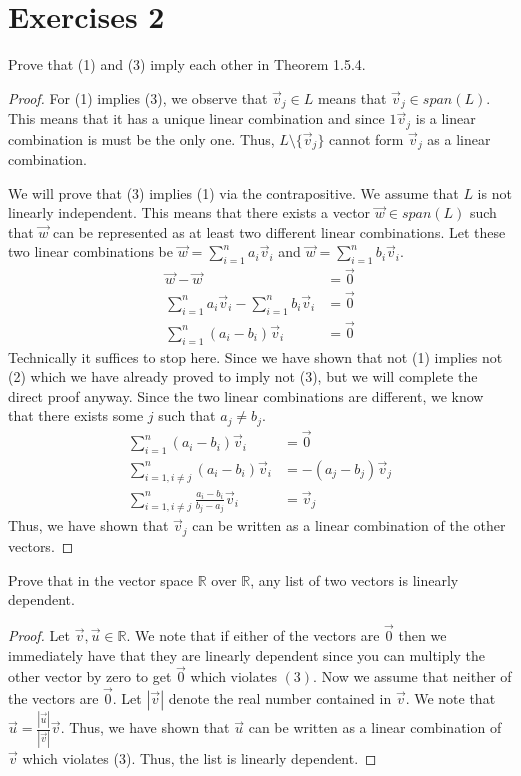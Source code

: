 \section{Exercises 2}
\begin{exercise}
    Prove that (1) and (3) imply each other in Theorem 1.5.4.
\end{exercise}
\begin{proof}
    For (1) implies (3), we observe that $\vec{v}_j\in L$ means that $\vec{v}_j\in span(L)$. This means that it has a unique linear combination and since $1\vec{v}_j$ is a linear combination is must be the only one. Thus, $L\setminus\{\vec{v}_j\}$ cannot form $\vec{v}_j$ as a linear combination.

    We will prove that (3) implies (1) via the contrapositive. We assume that $L$ is not linearly independent. This means that there exists a vector $\vec{w}\in span(L)$ such that $\vec{w}$ can be represented as at least two different linear combinations. Let these two linear combinations be $\vec{w}=\sum_{i=1}^n a_i\vec{v}_i$ and $\vec{w}=\sum_{i=1}^n b_i\vec{v}_i$.
    \begin{align*}
        \vec{w}-\vec{w}&=\vec{0}\\
        \sum_{i=1}^n a_i\vec{v}_i-\sum_{i=1}^n b_i\vec{v}_i&=\vec{0}\\
        \sum_{i=1}^n (a_i-b_i)\vec{v}_i&=\vec{0}
    \end{align*}
    Technically it suffices to stop here. Since we have shown that not (1) implies not (2) which we have already proved to imply not (3), but we will complete the direct proof anyway. Since the two linear combinations are different, we know that there exists some $j$ such that $a_j\neq b_j$.
    \begin{align*}
        \sum_{i=1}^n (a_i-b_i)\vec{v}_i&=\vec{0}\\
        \sum_{i=1, i\neq j}^n (a_i-b_i)\vec{v}_i&=-(a_j-b_j)\vec{v}_j\\
        \sum_{i=1, i\neq j}^n \frac{a_i-b_i}{b_j-a_j}\vec{v}_i&=\vec{v}_j
    \end{align*}
    Thus, we have shown that $\vec{v}_j$ can be written as a linear combination of the other vectors.
\end{proof}
\begin{exercise}
    Prove that in the vector space $\mathbb{R}$ over $\mathbb{R}$, any list of two vectors is linearly dependent.
\end{exercise}
\begin{proof}
    Let $\vec{v},\vec{u}\in\mathbb{R}$. We note that if either of the vectors are $\vec{0}$ then we immediately have that they are linearly dependent since you can multiply the other vector by zero to get $\vec{0}$ which violates $(3)$. Now we assume that neither of the vectors are $\vec{0}$. Let $|\vec{v}|$ denote the real number contained in $\vec{v}$. We note that $\vec{u}=\frac{|\vec{u}|}{|\vec{v}|}\vec{v}$. Thus, we have shown that $\vec{u}$ can be written as a linear combination of $\vec{v}$ which violates (3). Thus, the list is linearly dependent.
\end{proof}
